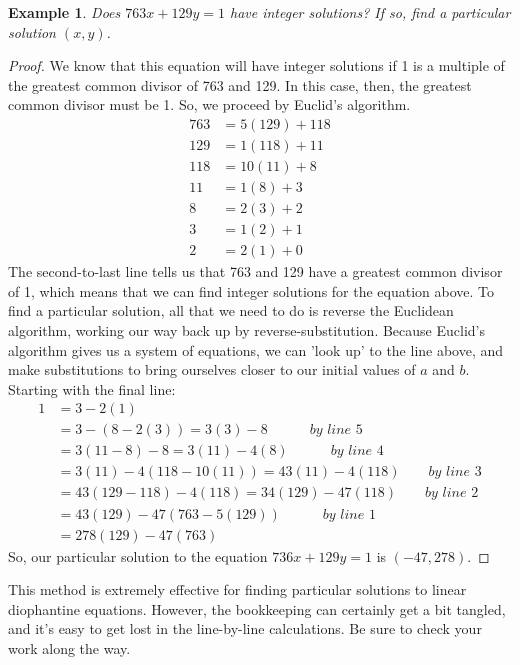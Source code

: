 \documentclass{article}
\newtheorem{example}{Example}
\begin{document}
\begin{mdframed} 
\begin{example} 
Does $763x + 129y = 1$ have integer solutions? If so, find a particular solution $(x, y)$. 
\end{example} 
\begin{proof}
We know that this equation will have integer solutions if 1 is a multiple of the greatest common divisor of 763 and 129. In this case, then, the greatest common divisor must be 1. So, we proceed by Euclid's algorithm. 
\begin{align}
763 &= 5(129) + 118 \\
129 &= 1(118) + 11 \\
118 &= 10(11) + 8 \\
11 &= 1(8) + 3 \\
8 &= 2(3) + 2 \\ 
3 &= 1(2) + 1\\
2 &= 2(1) + 0 
\end{align} 
The second-to-last line tells us that 763 and 129 have a greatest common divisor of 1, which means that we can find integer solutions for the equation above. To find a particular solution, all that we need to do is reverse the Euclidean algorithm, working our way back up by reverse-substitution. Because Euclid's algorithm gives us a system of equations, we can 'look up' to the line above, and make substitutions to bring ourselves closer to our initial values of $a$ and $b$. Starting with the final line: 
\begin{align*} 
1 &= 3 - 2(1) \\
 &= 3 - (8 - 2(3)) = 3(3) - 8 \qquad \quad \textit{by line 5} \\
 &= 3(11 - 8) - 8 = 3(11) - 4(8) \qquad \quad \textit{by line 4} \\
 &= 3(11) - 4(118 - 10(11)) = 43(11) - 4(118) \qquad \textit{by line 3}  \\
 &= 43(129 - 118) - 4(118) = 34(129) - 47(118) \qquad \textit{by line 2}\\
 &= 43(129) - 47(763 - 5(129)) \qquad \quad \textit{by line 1} \\
 &= 278(129) - 47(763)   
\end{align*}  
So, our particular solution to the equation $736x + 129y = 1$ is $(-47, 278)$. 
\end{proof} 
\end{mdframed} 
This method is extremely effective for finding particular solutions to linear diophantine equations. However, the bookkeeping can certainly get a bit tangled, and it's easy to get lost in the line-by-line calculations. Be sure to check your work along the way. 
\end{document}
